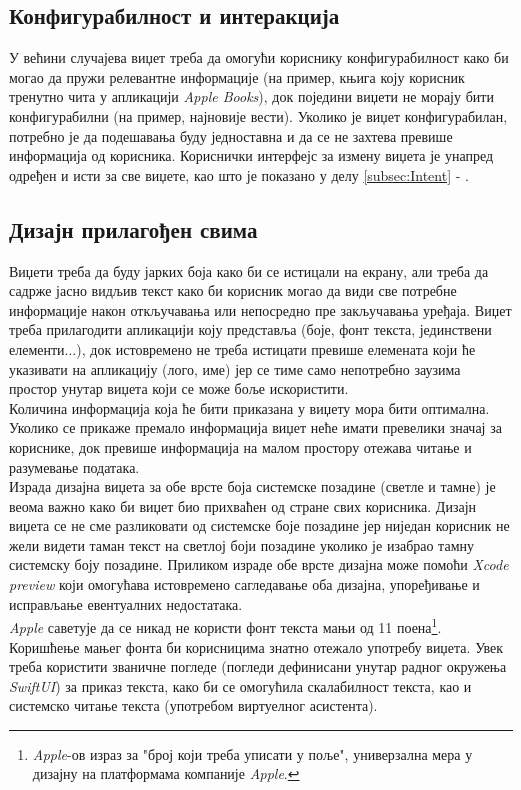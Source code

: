 \documentclass[12pt,oneside]{memoir}
\begin{document}
\subsection{Конфигурабилност и интеракција}
\indent У већини случајева виџет треба да омогући кориснику конфигурабилност како би могао да пружи релевантне информације (на пример, књига коју корисник тренутно чита у апликацији \textit{Apple Books}), док поједини виџети не морају бити конфигурабилни (на пример, најновије вести). Уколико је виџет конфигурабилан, потребно је да подешавања буду једноставна и да се не захтева превише информација од корисника. Кориснички интерфејс за измену виџета је унапред одређен и исти за све виџете, као што је показано у делу \ref{subsec:Intent} - .

\subsection{Дизајн прилагођен свима}
\indent Виџети треба да буду јарких боја како би се истицали на екрану, али треба да садрже јасно видљив текст како би корисник могао да види све потребне информације након откључавања или непосредно пре закључавања уређаја. Виџет треба прилагодити апликацији коју представља (боје, фонт текста, јединствени елементи...), док истовремено не треба истицати превише елемената који ће указивати на апликацију (лого, име) јер се тиме само непотребно заузима простор унутар виџета који се може боље искористити.  
\\
\indent Количина информација која ће бити приказана у виџету мора бити оптимална. Уколико се прикаже премало информација виџет неће имати превелики значај за кориснике, док превише информација на малом простору отежава читање и разумевање података.
\\
\indent Израда дизајна виџета за обе врсте боја системске позадине (светле и тамне) је веома важно како би виџет био прихваћен од стране свих корисника. Дизајн виџета се не сме разликовати од системске боје позадине јер ниједан корисник не жели видети таман текст на светлој боји позадине уколико је изабрао тамну системску боју позадине. Приликом израде обе врсте дизајна може помоћи \textit{Xcode preview} који омогућава истовремено сагледавање оба дизајна, упоређивање и исправљање евентуалних недостатака.
\\
\indent \textit{Apple} саветује да се никад не користи фонт текста мањи од 11 поена\footnote{\textit{Apple}-ов израз за "број који треба уписати у поље", универзална мера у дизајну на платформама компаније \textit{Apple}.}. Коришћење мањег фонта би корисницима знатно отежало употребу виџета. Увек треба користити званичне погледе (погледи дефинисани унутар радног окружења \textit{SwiftUI}) за приказ текста, како би се омогућила скалабилност текста, као и системско читање текста (употребом виртуелног асистента).
\end{document}
